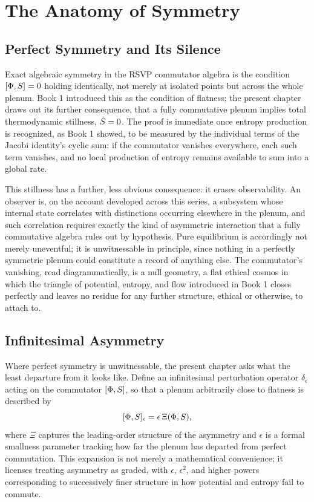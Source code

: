 \part{The Anatomy of Symmetry}

\chapter{Perfect Symmetry and Its Silence}

Exact algebraic symmetry in the RSVP commutator algebra is the condition $[\Phi, S] = 0$ holding identically, not merely at isolated points but across the whole plenum. Book 1 introduced this as the condition of flatness; the present chapter draws out its further consequence, that a fully commutative plenum implies total thermodynamic stillness, $\dot{S} = 0$. The proof is immediate once entropy production is recognized, as Book 1 showed, to be measured by the individual terms of the Jacobi identity's cyclic sum: if the commutator vanishes everywhere, each such term vanishes, and no local production of entropy remains available to sum into a global rate.

This stillness has a further, less obvious consequence: it erases observability. An observer is, on the account developed across this series, a subsystem whose internal state correlates with distinctions occurring elsewhere in the plenum, and such correlation requires exactly the kind of asymmetric interaction that a fully commutative algebra rules out by hypothesis. Pure equilibrium is accordingly not merely uneventful; it is unwitnessable in principle, since nothing in a perfectly symmetric plenum could constitute a record of anything else. The commutator's vanishing, read diagrammatically, is a null geometry, a flat ethical cosmos in which the triangle of potential, entropy, and flow introduced in Book 1 closes perfectly and leaves no residue for any further structure, ethical or otherwise, to attach to.

\chapter{Infinitesimal Asymmetry}

Where perfect symmetry is unwitnessable, the present chapter asks what the least departure from it looks like. Define an infinitesimal perturbation operator $\delta_\epsilon$ acting on the commutator $[\Phi, S]$, so that a plenum arbitrarily close to flatness is described by
\[
[\Phi, S]_\epsilon = \epsilon \, \Xi(\Phi, S),
\]
where $\Xi$ captures the leading-order structure of the asymmetry and $\epsilon$ is a formal smallness parameter tracking how far the plenum has departed from perfect commutation. This expansion is not merely a mathematical convenience; it licenses treating asymmetry as graded, with $\epsilon$, $\epsilon^2$, and higher powers corresponding to successively finer structure in how potential and entropy fail to commute.

